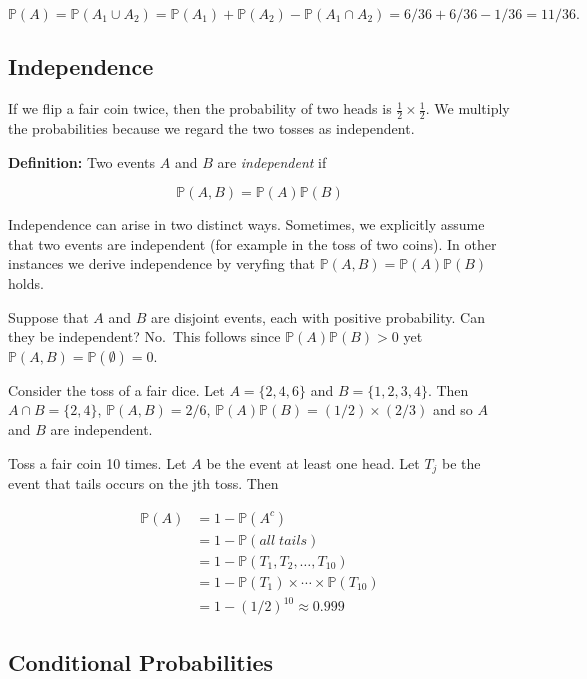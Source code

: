 \documentclass[
]{book}
\theoremstyle{definition}
\theoremstyle{definition}
\theoremstyle{definition}
\theoremstyle{definition}
\theoremstyle{remark}
\begin{document}
\[
\mathbb{P}(A)=\mathbb{P}(A_1\cup A_2)=\mathbb{P}(A_1)+\mathbb{P}(A_2)-\mathbb{P}(A_1\cap A_2)=6/36+ 6/36 -1/36 =11/36.
\]

\hypertarget{independence}{%
\subsection{Independence}\label{independence}}

If we flip a fair coin twice, then the probability of two heads is \(\frac{1}{2}\times \frac{1}{2}\). We multiply the probabilities because we regard the two tosses as independent.

\textbf{Definition:} Two events \(A\) and \(B\) are \emph{independent} if

\[
\mathbb{P}(A,B)=\mathbb{P}(A)\mathbb{P}(B)
\]

Independence can arise in two distinct ways. Sometimes, we explicitly assume that two events are independent (for example in the toss of two coins). In other instances we derive independence by veryfing that \(\mathbb{P}(A,B)=\mathbb{P}(A)\mathbb{P}(B)\) holds.

Suppose that \(A\) and \(B\) are disjoint events, each with positive probability. Can they be independent? No.~This follows since \(\mathbb{P}(A)\mathbb{P}(B)>0\) yet \(\mathbb{P}(A,B)=\mathbb{P}(\emptyset)=0.\)

Consider the toss of a fair dice. Let \(A=\{2,4,6\}\) and \(B=\{1,2,3,4\}\). Then \(A\cap B = \{2,4\}\), \(\mathbb{P}(A,B)=2/6\), \(\mathbb{P}(A)\mathbb{P}(B)=(1/2)\times (2/3)\) and so \(A\) and \(B\) are independent.

Toss a fair coin 10 times. Let \(A\) be the event at least one head. Let \(T_j\) be the event that tails occurs on the jth toss. Then

\begin{align}
\mathbb{P}(A) & = 1 - \mathbb{P}(A^c)\\
& = 1- \mathbb{P}(all\; tails)\\
& = 1- \mathbb{P}(T_1,T_2,\dots,T_{10})\\
& = 1- \mathbb{P}(T_1)\times\cdots\times\mathbb{P}(T_{10})\\
& = 1- (1/2)^{10}\approx 0.999
\end{align}

\hypertarget{conditional-probabilities}{%
\subsection{Conditional Probabilities}\label{conditional-probabilities}}
\end{document}
